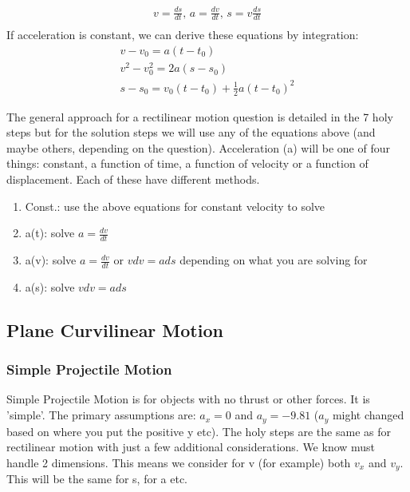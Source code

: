 \documentclass[a4paper, 12pt]{article}
\begin{document}
\begin{align*}
    v = \frac{ds}{dt} \text{, }
    a = \frac{dv}{dt} \text{, }
    s = v\frac{ds}{dt}\\
\end{align*}
If acceleration is constant, we can derive these equations by integration:
\begin{align}
    v - v_0 = a(t-t_0) \\ 
    v^2 - v_0^2 = 2a(s-s_0) \\ 
    s - s_0 = v_0(t-t_0) + \frac{1}{2}a(t-t_0)^2
\end{align}

\noindent
The general approach for a rectilinear motion question is detailed in the 7 holy steps but for the solution
steps we will use any of the equations above (and maybe others, depending on the question). Acceleration (a) will 
be one of four things: constant, a function of time, a function of velocity or a function of displacement. Each
of these have different methods.

\begin{enumerate}
    \item Const.: use the above equations for constant velocity to solve 
    \item a(t): solve $a = \frac{dv}{dt}$
    \item a(v): solve $a = \frac{dv}{dt}$ or $vdv = ads$ depending on what you are solving for
    \item a(s): solve $vdv = ads$ 
\end{enumerate}

\begin{center}
\subsection*{Plane Curvilinear Motion}
\end{center}
\subsubsection*{Simple Projectile Motion}
Simple Projectile Motion is for objects with no thrust or other forces. It is 'simple'.
The primary assumptions are: $a_x=0$ and $a_y=-9.81$ ($a_y$ might changed based on where you put the positive y etc).
The holy steps are the same as for rectilinear motion with just a few additional considerations. 
We know must handle 2 dimensions. This means we consider for v (for example) both $v_x$ and $v_y$. 
This will be the same for s, for a etc.
\end{document}
